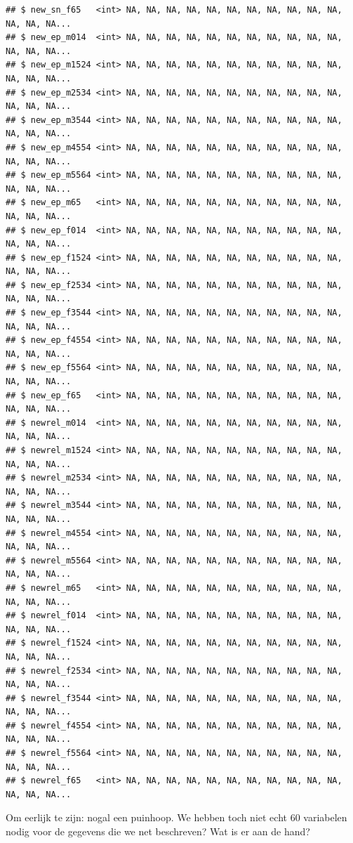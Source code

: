 \documentclass[]{tufte-book}
\begin{document}
\begin{verbatim}
## $ new_sn_f65   <int> NA, NA, NA, NA, NA, NA, NA, NA, NA, NA, NA, NA, NA, NA...
## $ new_ep_m014  <int> NA, NA, NA, NA, NA, NA, NA, NA, NA, NA, NA, NA, NA, NA...
## $ new_ep_m1524 <int> NA, NA, NA, NA, NA, NA, NA, NA, NA, NA, NA, NA, NA, NA...
## $ new_ep_m2534 <int> NA, NA, NA, NA, NA, NA, NA, NA, NA, NA, NA, NA, NA, NA...
## $ new_ep_m3544 <int> NA, NA, NA, NA, NA, NA, NA, NA, NA, NA, NA, NA, NA, NA...
## $ new_ep_m4554 <int> NA, NA, NA, NA, NA, NA, NA, NA, NA, NA, NA, NA, NA, NA...
## $ new_ep_m5564 <int> NA, NA, NA, NA, NA, NA, NA, NA, NA, NA, NA, NA, NA, NA...
## $ new_ep_m65   <int> NA, NA, NA, NA, NA, NA, NA, NA, NA, NA, NA, NA, NA, NA...
## $ new_ep_f014  <int> NA, NA, NA, NA, NA, NA, NA, NA, NA, NA, NA, NA, NA, NA...
## $ new_ep_f1524 <int> NA, NA, NA, NA, NA, NA, NA, NA, NA, NA, NA, NA, NA, NA...
## $ new_ep_f2534 <int> NA, NA, NA, NA, NA, NA, NA, NA, NA, NA, NA, NA, NA, NA...
## $ new_ep_f3544 <int> NA, NA, NA, NA, NA, NA, NA, NA, NA, NA, NA, NA, NA, NA...
## $ new_ep_f4554 <int> NA, NA, NA, NA, NA, NA, NA, NA, NA, NA, NA, NA, NA, NA...
## $ new_ep_f5564 <int> NA, NA, NA, NA, NA, NA, NA, NA, NA, NA, NA, NA, NA, NA...
## $ new_ep_f65   <int> NA, NA, NA, NA, NA, NA, NA, NA, NA, NA, NA, NA, NA, NA...
## $ newrel_m014  <int> NA, NA, NA, NA, NA, NA, NA, NA, NA, NA, NA, NA, NA, NA...
## $ newrel_m1524 <int> NA, NA, NA, NA, NA, NA, NA, NA, NA, NA, NA, NA, NA, NA...
## $ newrel_m2534 <int> NA, NA, NA, NA, NA, NA, NA, NA, NA, NA, NA, NA, NA, NA...
## $ newrel_m3544 <int> NA, NA, NA, NA, NA, NA, NA, NA, NA, NA, NA, NA, NA, NA...
## $ newrel_m4554 <int> NA, NA, NA, NA, NA, NA, NA, NA, NA, NA, NA, NA, NA, NA...
## $ newrel_m5564 <int> NA, NA, NA, NA, NA, NA, NA, NA, NA, NA, NA, NA, NA, NA...
## $ newrel_m65   <int> NA, NA, NA, NA, NA, NA, NA, NA, NA, NA, NA, NA, NA, NA...
## $ newrel_f014  <int> NA, NA, NA, NA, NA, NA, NA, NA, NA, NA, NA, NA, NA, NA...
## $ newrel_f1524 <int> NA, NA, NA, NA, NA, NA, NA, NA, NA, NA, NA, NA, NA, NA...
## $ newrel_f2534 <int> NA, NA, NA, NA, NA, NA, NA, NA, NA, NA, NA, NA, NA, NA...
## $ newrel_f3544 <int> NA, NA, NA, NA, NA, NA, NA, NA, NA, NA, NA, NA, NA, NA...
## $ newrel_f4554 <int> NA, NA, NA, NA, NA, NA, NA, NA, NA, NA, NA, NA, NA, NA...
## $ newrel_f5564 <int> NA, NA, NA, NA, NA, NA, NA, NA, NA, NA, NA, NA, NA, NA...
## $ newrel_f65   <int> NA, NA, NA, NA, NA, NA, NA, NA, NA, NA, NA, NA, NA, NA...
\end{verbatim}

Om eerlijk te zijn: nogal een puinhoop. We hebben toch niet echt 60 variabelen nodig voor de gegevens die we net beschreven? Wat is er aan de hand?
\end{document}
